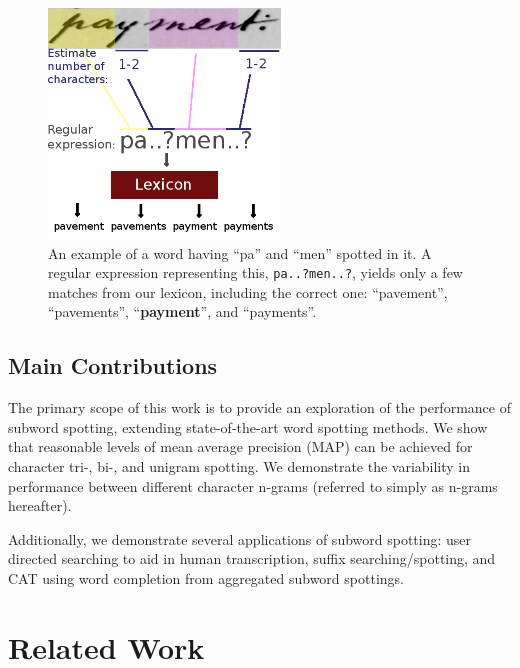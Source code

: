 \documentclass[ms,electronic,twosidetoc,letterpaper,chaptercenter,parttop,lof,lot]{byumsphd}
\begin{document}
\begin{figure}
    \centering
    \includegraphics[width=0.55\textwidth]{spotting_completion_payment}
    \caption{An example of a word having ``pa'' and ``men'' spotted in it. A regular expression representing this, \texttt{pa..?men..?}, yields only a few matches from our lexicon, including the correct one: ``pavement'', ``pavements'', ``\textbf{payment}'', and ``payments''.}
    \label{fig:subtransexample}
\end{figure}


\section{Main Contributions}

The primary scope of this work is to provide an exploration of the performance of subword spotting, extending state-of-the-art word spotting methods.
We show that reasonable levels of mean average precision (MAP) can be achieved for character tri-, bi-, and unigram spotting. We demonstrate the variability in performance between different character n-grams (referred to simply as n-grams hereafter).

Additionally, we demonstrate several applications of subword spotting: user directed searching to aid in human transcription, suffix searching/spotting, and CAT using word completion from aggregated subword spottings.

\chapter{Related Work}\label{relatedwork}
\end{document}
